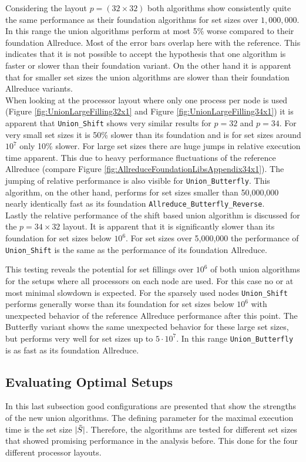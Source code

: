 Considering the layout $p=(32\times32)$ both algorithms show consistently quite the same performance as their foundation algorithms for set sizes over $1,000,000$. In this range the union algorithms perform at most 5\% worse compared to their foundation Allreduce. Most of the error bars overlap here with the reference. This indicates that it is not possible to accept the hypothesis that one algorithm is faster or slower than their foundation variant. On the other hand it is apparent that for smaller set sizes the union algorithms are slower than their foundation Allreduce variants.\\
When looking at the processor layout where only one process per node is used (Figure \ref{fig:UnionLargeFilling32x1} and Figure \ref{fig:UnionLargeFilling34x1}) it is apparent that \texttt{Union\_Shift} shows very similar results for $p=32$ and $p=34$. For very small set sizes it is 50\% slower than its foundation and is for set sizes around $10^7$ only 10\% slower. For large set sizes there are huge jumps in relative execution time apparent. This due to heavy performance fluctuations of the reference Allreduce (compare Figure \ref{fig:AllreduceFoundationLibsAppendix34x1}). The jumping of relative performance is also visible for \texttt{Union\_Butterfly}. This algorithm, on the other hand, performs for set sizes smaller than 50,000,000 nearly identically fast as its foundation \texttt{All\-re\-duce\_But\-ter\-fly\_Reverse}.\\
Lastly the relative performance of the shift based union algorithm is discussed for the $p=34\times32$ layout. It is apparent that it is significantly slower than its foundation for set sizes below $10^6$. For set sizes over 5,000,000 the performance of \texttt{Union\_Shift} is the same as the performance of its foundation Allreduce.

This testing reveals the potential for set fillings over $10^6$ of both union algorithms for the setups where all processors on each node are used. For this case no or at most minimal slowdown is expected. For the sparsely used nodes \texttt{Union\_Shift} performs generally worse than its foundation for set sizes below $10^6$ with unexpected behavior of the reference Allreduce performance after this point. The Butterfly variant shows the same unexpected behavior for these large set sizes, but performs very well for set sizes up to $5\cdot10^7$. In this range \texttt{Union\_Butterfly} is as fast as its foundation Allreduce.

\subsection{Evaluating Optimal Setups}
In this last subsection good configurations are presented that show the strengths of the new union algorithms. The defining parameter for the maximal execution time is the set size $|\Tilde{S}|$. Therefore, the algorithms are tested for different set sizes that showed promising performance in the analysis before. This done for the four different processor layouts.
